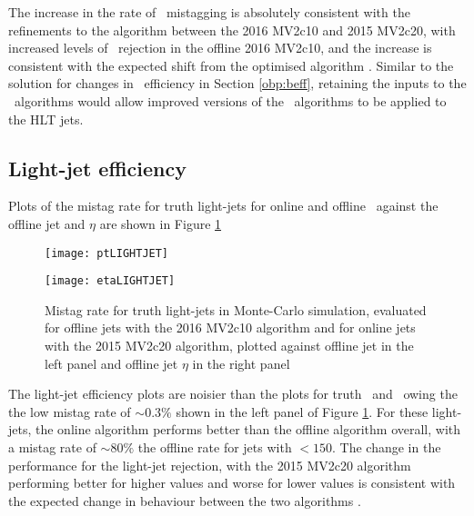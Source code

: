 		The increase in the rate of \cjet\, mistagging is absolutely consistent with the refinements to the algorithm between the 2016 MV2c10 and 2015 MV2c20, with increased levels of \cjet\, rejection in the offline 2016 MV2c10, and the increase is consistent with the expected shift from the optimised algorithm \cite{btagOptimisation}. Similar to the solution for changes in \btag\ efficiency in Section \ref{obp:beff}, retaining the inputs to the \btag\ algorithms would allow improved versions of the \btag\ algorithms to be applied to the HLT jets.

	\subsection{Light-jet efficiency}

		Plots of the mistag rate for truth light-jets for online and offline \btag\ against the offline jet \pt and $\eta$ are shown in Figure \ref{fig:MC:lightjetefficiency}

		\begin{figure}[h]
			\centering
			\begin{minipage}[h]{0.48\linewidth}
				\texttt{[image: ptLIGHTJET]}

			\end{minipage}
			\quad
			\begin{minipage}[h]{0.48\linewidth}
				\texttt{[image: etaLIGHTJET]}
			\end{minipage}
			\caption{Mistag rate for truth light-jets in Monte-Carlo simulation, evaluated for offline jets with the 2016 MV2c10 algorithm and for online jets with the 2015 MV2c20 algorithm, plotted against offline jet \pt in the left panel and offline jet $\eta$ in the right panel}
			\label{fig:MC:lightjetefficiency}
		\end{figure}

		The light-jet efficiency plots are noisier than the plots for truth \bjets\ and \cjets\, owing the the low mistag rate of $\sim0.3\%$ shown in the left panel of Figure \ref{fig:MC:lightjetefficiency}. For these light-jets, the online algorithm performs better than the offline algorithm overall, with a mistag rate of $\sim80\%$ the offline rate for jets with \pt$<150$. The change in the performance for the light-jet rejection, with the 2015 MV2c20 algorithm performing better for higher \pt values and worse for lower \pt values is consistent with the expected change in behaviour between the two algorithms \cite{btagOptimisation}.


